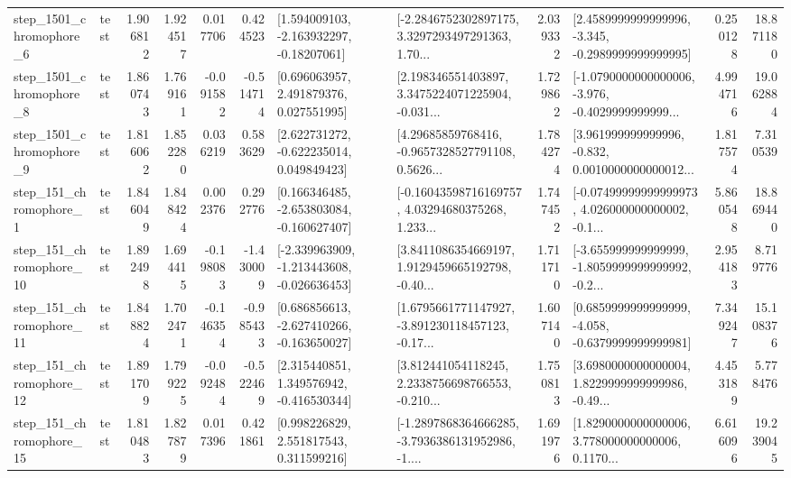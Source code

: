 \begin{tabular}{llrrrrllrlrr}
  step\_1501\_chromophore\_6 &      test &      1.906812 &    1.924517 &      0.017706 &  0.424523 &    [1.594009103, -2.163932297, -0.18207061] &  [-2.2846752302897175, 3.3297293497291363, 1.70... &       2.039332 &  [2.4589999999999996, -3.345, -0.2989999999999995] &            0.250128 &         18.871180 \\
  step\_1501\_chromophore\_8 &      test &      1.860743 &    1.769161 &     -0.091582 & -0.514714 &     [0.696063957, 2.491879376, 0.027551995] &  [2.198346551403897, 3.3475224071225904, -0.031... &       1.729862 &  [-1.0790000000000006, -3.976, -0.4029999999999... &            4.994716 &         19.062884 \\
  step\_1501\_chromophore\_9 &      test &      1.816062 &    1.852280 &      0.036219 &  0.583629 &    [2.622731272, -0.622235014, 0.049849423] &  [4.29685859768416, -0.9657328527791108, 0.5626... &       1.784274 &  [3.961999999999996, -0.832, 0.0010000000000012... &            1.817574 &          7.310539 \\
   step\_151\_chromophore\_1 &      test &      1.846049 &    1.848424 &      0.002376 &  0.292776 &   [0.166346485, -2.653803084, -0.160627407] &  [-0.16043598716169757, 4.03294680375268, 1.233... &       1.747452 &  [-0.07499999999999973, 4.026000000000002, -0.1... &            5.860548 &         18.869440 \\
  step\_151\_chromophore\_10 &      test &      1.892498 &    1.694415 &     -0.198083 & -1.430009 &  [-2.339963909, -1.213443608, -0.026636453] &  [3.8411086354669197, 1.9129459665192798, -0.40... &       1.711710 &  [-3.655999999999999, -1.8059999999999992, -0.2... &            2.954183 &          8.719776 \\
  step\_151\_chromophore\_11 &      test &      1.848824 &    1.702471 &     -0.146354 & -0.985433 &   [0.686856613, -2.627410266, -0.163650027] &  [1.6795661771147927, -3.891230118457123, -0.17... &       1.607140 &  [0.6859999999999999, -4.058, -0.6379999999999981] &            7.349247 &         15.108376 \\
  step\_151\_chromophore\_12 &      test &      1.891709 &    1.799225 &     -0.092484 & -0.522469 &    [2.315440851, 1.349576942, -0.416530344] &  [3.812441054118245, 2.2338756698766553, -0.210... &       1.750813 &  [3.6980000000000004, 1.8229999999999986, -0.49... &            4.453189 &          5.778476 \\
  step\_151\_chromophore\_15 &      test &      1.810483 &    1.827879 &      0.017396 &  0.421861 &     [0.998226829, 2.551817543, 0.311599216] &  [-1.2897868364666285, -3.7936386131952986, -1.... &       1.691976 &  [1.8290000000000006, 3.778000000000006, 0.1170... &            6.616096 &         19.239045 \\

\end{tabular}
